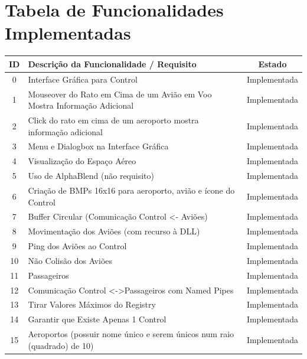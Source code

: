 \documentclass[11pt]{article}
\begin{document}
	\section{Tabela de Funcionalidades Implementadas}
	\normalsize
    \begin{tabularx}{\textwidth}{|c|X|c|}
        \hline
        \textbf{ID} & \textbf{Descrição da Funcionalidade / Requisito} & \textbf{Estado} \\
        \hline
        0 & Interface Gráfica para Control & Implementada \\ 
        \hline
        1 & Mouseover do Rato em Cima de um Avião em Voo Mostra Informação Adicional & Implementada \\
        \hline
        2 & Click do rato em cima de um aeroporto mostra informação adicional  & Implementada \\
        \hline
        3 & Menu e Dialogbox na Interface Gráfica & Implementada \\
        \hline
        4 & Visualização do Espaço Aéreo & Implementada \\ 
        \hline
        5 & Uso de AlphaBlend (não requisito) & Implementada \\ 
        \hline
        6 & Criação de BMPs 16x16 para aeroporto, avião e ícone do Control & Implementada \\ 
        \hline
        7 & Buffer Circular (Comunicação Control \textless{-} Aviões) & Implementada \\ 
        \hline
        8 & Movimentação dos Aviões (com recurso à DLL) & Implementada \\ 
        \hline
        9 & Ping dos Aviões ao Control & Implementada \\
        \hline
        10 & Não Colisão dos Aviões & Implementada \\ 
        \hline
        11 & Passageiros & Implementada \\ 
        \hline
        12 & Comunicação Control \textless{-}\textgreater Passageiros com Named Pipes & Implementada \\ 
        \hline
        13 & Tirar Valores Máximos do Registry & Implementada \\ 
        \hline
        14 & Garantir que Existe Apenas 1 Control & Implementada \\ 
        \hline
        15 & Aeroportos (possuir nome único e serem únicos num raio (quadrado) de 10) & Implementada \\ 
        \hline
    \end{tabularx}
    
\end{document}
